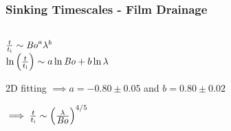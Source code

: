 \documentclass{beamer}
\newcommand\Bo{\mbox{\textit{Bo}}}  %
\begin{document}
\begin{frame}
  \frametitle{Sinking Timescales - Film Drainage}

  \begin{columns}[t]
    \begin{column}{0.5\paperwidth}
      \centering
      \resizebox{0.9\textwidth}{!}{}

\vspace{0.5cm}

$\frac{t}{t_{\text{i}}} \sim \Bo^{a} \lambda^{b}$ \\
\vspace{0.1cm}
$\ln\left(\frac{t}{t_{\text{i}}}\right) \sim a \ln\Bo + b \ln\lambda$ \\
\vspace{0.1cm}

2D fitting $\implies a = -0.80 \pm 0.05$ and $b = 0.80 \pm 0.02$ \\
\vspace{0.1cm}

$\implies  \frac{t}{t_{\text{i}}} \sim \left(\frac{\lambda}{\Bo}\right)^{4/5}$ \\
    \end{column}

    \begin{column}{0.5\paperwidth}
      \centering
      \resizebox{0.9\textwidth}{!}{}

      \resizebox{0.9\textwidth}{!}{}

    \end{column}
  \end{columns}


\end{frame}
\end{document}
